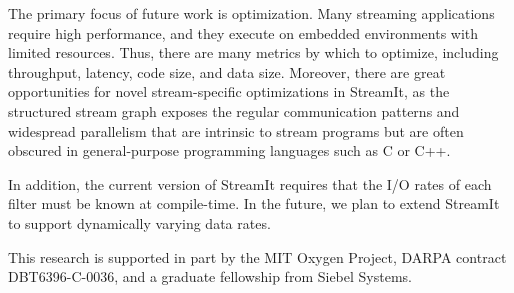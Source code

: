  The primary focus of future work is
optimization.  Many streaming applications require high performance,
and they execute on embedded environments with limited resources.
Thus, there are many metrics by which to optimize, including
throughput, latency, code size, and data size.  Moreover, there are
great opportunities for novel stream-specific optimizations in
StreamIt, as the structured stream graph exposes the regular
communication patterns and widespread parallelism that are intrinsic
to stream programs but are often obscured in general-purpose
programming languages such as C or C++.

In addition, the current version of StreamIt requires that the I/O
rates of each filter must be known at compile-time.  In the future, we
plan to extend StreamIt to support dynamically varying data rates.

This research is supported in part by the MIT Oxygen Project, DARPA
contract DBT6396-C-0036, and a graduate fellowship from Siebel Systems.

%
%
% 

